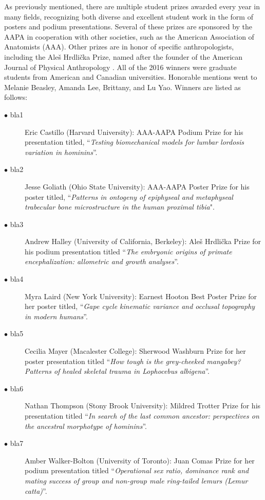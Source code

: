 \documentclass[english]{ijsra}
\begin{document}
As previously mentioned, there are multiple student prizes awarded every year in many fields,
recognizing both diverse and excellent student work in the form of posters and podium presentations. 
Several of these prizes are sponsored by the AAPA in cooperation with other societies,
such as the American Association of Anatomists (AAA). 
Other prizes are in honor of specific anthropologists, including the Aleš Hrdlička Prize,
named after the founder of the American Journal of Physical Anthropology \parencite{american association of physical anthropologists}.
All of the 2016 winners were graduate students from American and Canadian universities. 
Honorable mentions went to Melanie Beasley, Amanda Lee, Brittany, and Lu Yao.  
Winners are listed as follows: 
\begin{description}
  \item[$\bullet$ bla1] Eric Castillo (Harvard University): AAA-AAPA Podium Prize for his presentation titled, “\emph{Testing biomechanical models for lumbar lordosis variation in hominins}”.
  \item[$\bullet$ bla2] Jesse Goliath (Ohio State University): AAA-AAPA Poster Prize for his poster titled, “\emph{Patterns in ontogeny of epiphyseal and metaphyseal trabecular bone microstructure in the human proximal tibia}".
  \item[$\bullet$ bla3] Andrew Halley (University of California, Berkeley): Aleš Hrdlička Prize for his podium presentation titled “\emph{The embryonic origins of primate encephalization: allometric and growth analyses}”.
  \item[$\bullet$ bla4] Myra Laird (New York University): Earnest Hooton Best Poster Prize for her poster titled, “\emph{Gape cycle kinematic variance and occlusal topography in modern humans}”.
  \item[$\bullet$ bla5] Cecilia Mayer (Macalester College): Sherwood Washburn Prize for her poster presentation titled “\emph{How tough is the grey-cheeked mangabey? Patterns of healed skeletal trauma in \emph{Lophocebus albigena}}”.
  \item[$\bullet$ bla6] Nathan Thompson (Stony Brook University): Mildred Trotter Prize for his presentation titled “\emph{In search of the last common ancestor: perspectives on the ancestral morphotype of hominins}”.
  \item[$\bullet$ bla7] Amber Walker-Bolton (University of Toronto): Juan Comas Prize for her podium presentation titled “\emph{Operational sex ratio, dominance rank and mating success of group and non-group male ring-tailed lemurs (\emph{Lemur catta})}”.
\end{description}
\end{document}
